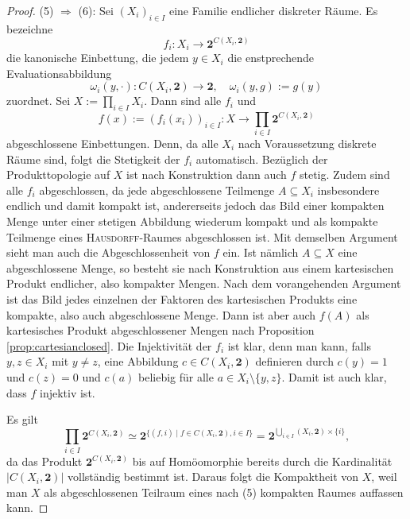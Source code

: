 \begin{proof}
  (5) $\Rightarrow$ (6):
  Sei $(X_i)_{i \in I}$ eine Familie endlicher diskreter Räume.
  Es bezeichne
  \begin{displaymath}
    f_i \colon X_i \to \mathbf{2}^{C(X_i,\mathbf{2})}
  \end{displaymath}
  die kanonische Einbettung, die jedem  $y \in X_i$ die enstprechende Evaluationsabbildung
  \begin{displaymath}
    \omega_i(y,\cdot) \colon C(X_i,\mathbf{2}) \to \mathbf{2}, \quad \omega_i(y,g) := g(y)
  \end{displaymath}
  zuordnet.
  Sei $X := \prod_{i \in I} X_i$.
  Dann sind alle $f_i$  und
  \begin{displaymath}
    f(x) := (f_i(x_i))_{i \in I} \colon X \to \prod_{i \in I} \mathbf{2}^{C(X_i,\mathbf{2})}
  \end{displaymath}
  abgeschlossene Einbettungen.
  Denn, da alle $X_i$ nach Voraussetzung diskrete Räume sind, folgt die Stetigkeit der $f_i$ automatisch.
  Bezüglich der Produkttopologie auf $X$ ist nach Konstruktion dann auch $f$ stetig.
  Zudem sind alle $f_i$ abgeschlossen, da jede abgeschlossene Teilmenge $A \subseteq X_i$ insbesondere endlich und damit kompakt ist, andererseits jedoch das Bild einer kompakten Menge unter einer stetigen Abbildung wiederum kompakt und als kompakte Teilmenge eines \textsc{Hausdorff}-Raumes abgeschlossen ist.  
  Mit demselben Argument sieht man auch die Abgeschlossenheit von $f$ ein.
  Ist nämlich $A \subseteq X$ eine abgeschlossene Menge, so besteht sie nach Konstruktion aus einem kartesischen Produkt endlicher, also kompakter Mengen.
  Nach dem vorangehenden Argument ist das Bild jedes einzelnen der Faktoren des kartesischen Produkts eine kompakte, also auch abgeschlossene Menge.
  Dann ist aber auch $f(A)$ als kartesisches Produkt abgeschlossener Mengen nach Proposition \ref{prop:cartesianclosed}.
  Die Injektivität der $f_i$ ist klar, denn man kann, falls $y,z \in X_i$ mit $y \neq z$, eine Abbildung $c \in C(X_i,\mathbf{2})$ definieren durch $c(y) = 1$ und $c(z) = 0$ und $c(a)$ beliebig für alle $a \in X_i \setminus \{y,z\}$.
  Damit ist auch klar, dass $f$ injektiv ist.
   
  Es gilt 
  \begin{displaymath}
    \prod_{i \in I} \mathbf{2}^{C(X_i,\mathbf{2})} 
    \simeq \mathbf{2}^{\{(f,i) \mid f \in C(X_i,\mathbf{2}), i \in I\}}
    = \mathbf{2}^{\bigcup_{i \in I} (X_i,\mathbf{2}) \times \{i\}},
  \end{displaymath}
  da das Produkt $\mathbf{2}^{C(X_i,\mathbf{2})}$ bis auf Homöomorphie bereits durch die Kardinalität $|C( X_i, \mathbf{2} )|$ vollständig bestimmt ist.
  Daraus folgt die Kompaktheit von $X$, weil man $X$ als abgeschlossenen Teilraum eines nach (5) kompakten Raumes auffassen kann.


\end{proof}
